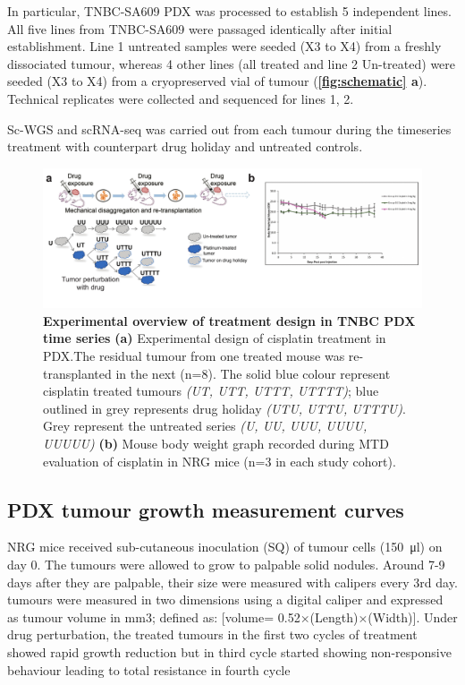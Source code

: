 In particular, TNBC-SA609 PDX was processed to establish 5 independent lines. All five lines from TNBC-SA609 were passaged identically after initial establishment. Line 1 untreated samples were seeded (X3 to X4) from a freshly dissociated tumour, whereas 4 other lines (all treated and line 2 Un-treated) were seeded (X3 to X4) from a cryopreserved vial of tumour (\textbf{\autoref{fig:schematic} a}). Technical replicates were collected and sequenced for lines 1, 2. 

Sc-WGS and scRNA-seq was carried out from each tumour during the timeseries treatment with counterpart drug holiday and untreated controls.

\begin{figure}
\centering
\includegraphics[width=\textwidth]{Figures/chap2/treatmentdesignMTD.pdf}
	
\caption[Experimental overview of TNBC PDX treated time series]
	{\small
	\textbf{Experimental overview of treatment design in TNBC PDX time series}
\textbf{(a)} Experimental design of cisplatin treatment in PDX.The residual tumour from one treated mouse was re-transplanted in the next (n=8). The solid blue colour represent cisplatin treated tumours \textit{(UT, UTT, UTTT, UTTTT)}; blue outlined in grey represents drug holiday \textit{(UTU, UTTU, UTTTU)}. Grey represent the untreated series \textit{(U, UU, UUU, UUUU, UUUUU)} \textbf{(b)} Mouse body weight graph recorded during \ac{MTD} evaluation of cisplatin in NRG mice (n=3 in each study cohort).}
	
	\label{fig:treatmentdesignMTD}
\end{figure}


\subsection{PDX tumour growth measurement curves} 
NRG mice received sub-cutaneous inoculation (SQ) of tumour cells (\SI{150}{\ul}) on day 0. 
The tumours were allowed to grow to palpable solid nodules.
Around 7-9 days after they are palpable, their size were measured with calipers every 3rd day. 
tumours were measured in two dimensions using a digital caliper and expressed as tumour volume in mm3; defined as: [volume= 0.52$\times$(Length)$\times$(Width)].
Under drug perturbation, the treated tumours in the first two cycles of treatment showed rapid growth reduction but in third cycle started showing non-responsive behaviour leading to total resistance in fourth cycle 



